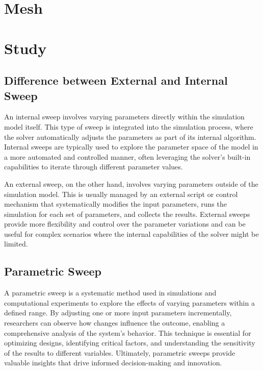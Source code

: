 \section{Mesh}

\section{Study}
    \subsection{Difference between External and Internal Sweep}
        An internal sweep involves varying parameters directly within the 
        simulation model itself. This type of sweep is integrated into the 
        simulation process, where the solver automatically adjusts the parameters 
        as part of its internal algorithm. Internal sweeps are typically used to 
        explore the parameter space of the model in a more automated and 
        controlled manner, often leveraging the solver's built-in capabilities 
        to iterate through different parameter values.

        
        \vspace{1em} \noindent An external sweep, on the other hand, involves varying parameters outside 
        of the simulation model. This is usually managed by an external script 
        or control mechanism that systematically modifies the input parameters, 
        runs the simulation for each set of parameters, and collects the results. 
        External sweeps provide more flexibility and control over the parameter 
        variations and can be useful for complex scenarios where the internal 
        capabilities of the solver might be limited.
    \subsection{Parametric Sweep}
        A parametric sweep is a systematic method used in simulations and computational 
        experiments to explore the effects of varying parameters within a defined range. 
        By adjusting one or more input parameters incrementally, researchers can observe 
        how changes influence the outcome, enabling a comprehensive analysis of the 
        system's behavior. This technique is essential for optimizing designs, 
        identifying critical factors, and understanding the sensitivity of the results 
        to different variables. Ultimately, parametric sweeps provide valuable insights 
        that drive informed decision-making and innovation.

